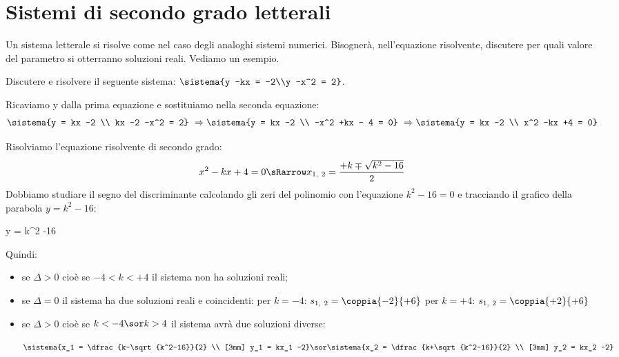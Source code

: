 \section{Sistemi di secondo grado letterali}
\label{sec:sist2gr_sistemiletterali}

Un sistema letterale si risolve come nel caso degli analoghi sistemi numerici.
Bisognerà, nell'equazione risolvente, discutere per quali valore del 
parametro si otterranno soluzioni reali. 
Vediamo un esempio.

\begin{esempio}{}{}
Discutere e risolvere il seguente sistema: 
\(\sistema{y -kx = -2\\y -x^2 = 2}\).

\medskip
Ricaviamo y dalla prima equazione e sostituiamo nella seconda equazione:
\[ \sistema{y = kx -2 \\ kx -2 -x^2 = 2}\ 
\Rightarrow\sistema{y = kx -2 \\ -x^2 +kx - 4 = 0}\ 
\Rightarrow\sistema{y = kx -2 \\ x^2 -kx +4 = 0}\]

Risolviamo l'equazione risolvente di secondo grado: \\[-.5em]
\[x^2 -kx +4 = 0 \sRarrow x_{1,~2} = \dfrac{+k \mp \sqrt{k^2-16}}{2}\]
Dobbiamo studiare il segno del discriminante 
calcolando gli zeri del polinomio con l'equazione \(k^2 -16 = 0\) e 
tracciando il grafico della parabola \(y = k^2 -16\):

           {y = k^2 -16}
           {} 

Quindi:
\begin{itemize}
\item se \(\Delta > 0\) cioè se \(-4 < k < +4\) il sistema non ha soluzioni 
reali;
\item se \(\Delta = 0\) il sistema ha due soluzioni reali e 
coincidenti:
\subitem per \(k = -4\): \quad \(s_{1,~2} = \coppia{-2}{+6}\) 
\subitem per \(k = +4\): \quad \(s_{1,~2} = \coppia{+2}{+6}\)
\item se \(\Delta > 0\) cioè se \(k<-4 \sor k>4\) il sistema avrà due 
soluzioni diverse: 

\medskip
\(
\sistema{x_1 = \dfrac{k-\sqrt{k^2-16}}{2} \\ [3mm]
         y_1 = kx_1 -2}
\sor 
\sistema{x_2 = \dfrac{k+\sqrt{k^2-16}}{2} \\ [3mm]
         y_2 = kx_2 -2}
\)
\end{itemize}
\end{esempio}

